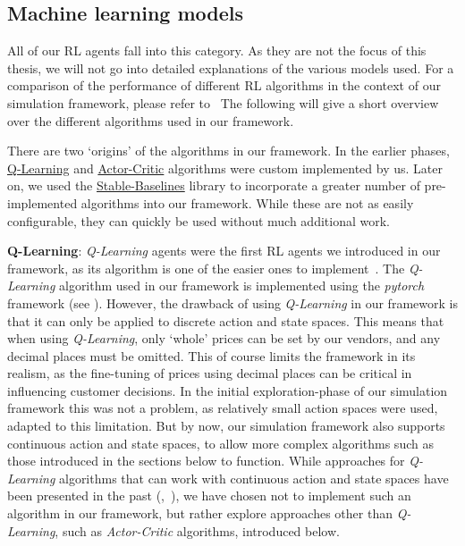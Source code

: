 \subsection{Machine learning models}\label{subsec:MachineLearningModels}

All of our RL agents fall into this category. As they are not the focus of this thesis, we will not go into detailed explanations of the various models used. For a comparison of the performance of different RL algorithms in the context of our simulation framework, please refer to~\cite{JanThesis} The following will give a short overview over the different algorithms used in our framework.

There are two `origins' of the algorithms in our framework. In the earlier phases, \hyperref[item:QLearning]{Q-Learning} and \hyperref[item:ActorCritic]{Actor-Critic} algorithms were custom implemented by us. Later on, we used the \hyperref[item:StableBaselines]{Stable-Baselines} library to incorporate a greater number of pre-implemented algorithms into our framework. While these are not as easily configurable, they can quickly be used without much additional work.

\medskip
\noindent\textbf{Q-Learning}:\label{item:QLearning} \emph{Q-Learning} agents were the first RL agents we introduced in our framework, as its algorithm is one of the easier ones to implement~\cite{reinforcementLearningOverview}. The \emph{Q-Learning} algorithm used in our framework is implemented using the \emph{pytorch} framework (see \cite{Pytorch}). However, the drawback of using \emph{Q-Learning} in our framework is that it can only be applied to discrete action and state spaces. This means that when using \emph{Q-Learning}, only `whole' prices can be set by our vendors, and any decimal places must be omitted. This of course limits the framework in its realism, as the fine-tuning of prices using decimal places can be critical in influencing customer decisions. In the initial exploration-phase of our simulation framework this was not a problem, as relatively small action spaces were used, adapted to this limitation. But by now, our simulation framework also supports continuous action and state spaces, to allow more complex algorithms such as those introduced in the sections below to function. While approaches for \emph{Q-Learning} algorithms that can work with continuous action and state spaces have been presented in the past (\cite{QLearningContinuous},~\cite{QLearningContinuous2}), we have chosen not to implement such an algorithm in our framework, but rather explore approaches other than \emph{Q-Learning}, such as \emph{Actor-Critic} algorithms, introduced below.

